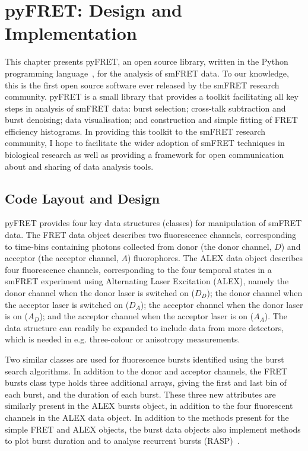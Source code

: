 \section{pyFRET: Design and Implementation}
This chapter presents pyFRET, an open source library, written in the Python programming language~\cite{vanRossum1995}, for the analysis of smFRET data. To our knowledge, this is the first open source software ever released by the smFRET research community. pyFRET is a small library that provides a toolkit facilitating all key steps in analysis of smFRET data: burst selection; cross-talk subtraction and burst denoising; data visualisation; and construction and simple fitting of FRET efficiency histograms. In providing this toolkit to the smFRET research community, I hope to facilitate the wider adoption of smFRET techniques in biological research as well as providing a framework for open communication about and sharing of data analysis tools.

\subsection{Code Layout and Design}
pyFRET provides four key data structures (classes) for manipulation of smFRET data. The FRET data object describes two fluorescence channels, corresponding to time-bins containing photons collected from donor (the donor channel, $D$) and acceptor (the acceptor channel, $A$) fluorophores. The ALEX data object describes four fluorescence channels, corresponding to the four temporal states in a smFRET experiment using Alternating Laser Excitation (ALEX), namely the donor channel when the donor laser is switched on ($D_D$); the donor channel when the acceptor laser is switched on ($D_A$); the acceptor channel when the donor laser is on ($A_D$); and the acceptor channel when the acceptor laser is on ($A_A$). The data structure can readily be expanded to include data from more detectors, which is needed in e.g. three-colour or anisotropy measurements.

Two similar classes are used for fluorescence bursts identified using the burst search algorithms. In addition to the donor and acceptor channels, the FRET bursts class type holds three additional arrays, giving the first and last bin of each burst, and the duration of each burst. These three new attributes are similarly present in the ALEX bursts object, in addition to the four fluorescent channels in the ALEX data object. In addition to the methods present for the simple FRET and ALEX objects, the burst data objects also implement methods to plot burst duration and to analyse recurrent bursts (RASP)~\cite{hoffmann11}. 

